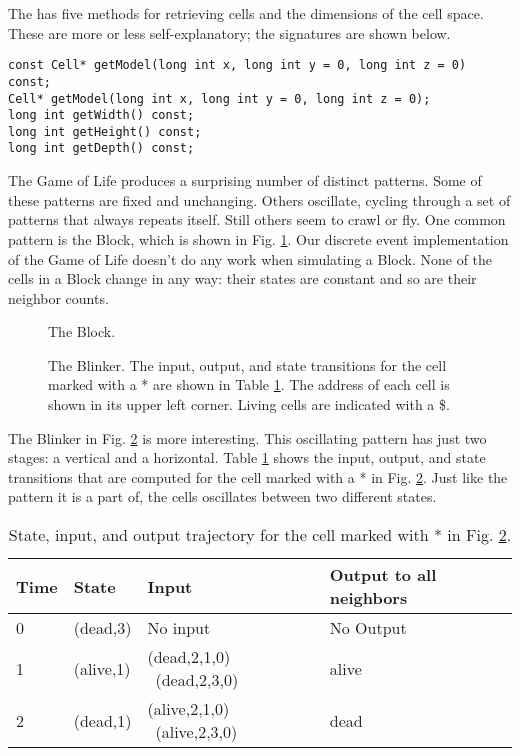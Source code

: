 The  has five methods for retrieving cells and the dimensions of the cell space. These are more or less self-explanatory; the signatures are shown below.
\begin{verbatim}
const Cell* getModel(long int x, long int y = 0, long int z = 0) const;
Cell* getModel(long int x, long int y = 0, long int z = 0);
long int getWidth() const;
long int getHeight() const;
long int getDepth() const;
\end{verbatim}

The Game of Life produces a surprising number of distinct patterns. Some of these patterns are fixed and unchanging. Others oscillate, cycling through a set of patterns that always repeats itself. Still others seem to crawl or fly. One common pattern is the Block, which is shown in Fig. \ref{fig:gol_block}. Our discrete event implementation of the Game of Life doesn't do any work when simulating a Block. None of the cells in a Block change in any way: their states are constant and so are their neighbor counts.
\begin{figure}[ht]
\centering
{}
\caption{The Block.}
\label{fig:gol_block}
\end{figure}

\begin{figure}[ht]
\centering
{}
\caption{The Blinker. The input, output, and state transitions for the cell marked with a * are shown in Table \ref{tab:blinker_cell_activity}. The address of each cell is shown in its upper left corner. Living cells are indicated with a \$.}
\label{fig:gol_blinker}
\end{figure}
The Blinker in Fig. \ref{fig:gol_blinker} is more interesting. This oscillating pattern has just two stages: a vertical and a horizontal. Table \ref{tab:blinker_cell_activity} shows the input, output, and state transitions that are computed for the cell marked with a * in Fig. \ref{fig:gol_blinker}. Just like the pattern it is a part of, the cells oscillates between two different states.
\begin{table}[ht]
\centering
\begin{tabular}{|l|l|l|l|}
\hline Time & State      & Input & Output to all neighbors\\ \hline
0 & (dead,3) & No input & No Output \\ \hline 
1 & (alive,1) & (dead,2,1,0) \ (dead,2,3,0) & alive \\ \hline 
2 & (dead,1) & (alive,2,1,0) \ (alive,2,3,0) & dead \\ \hline
\end{tabular}
\caption{State, input, and output trajectory for the cell marked with * in Fig. \ref{fig:gol_blinker}.}
\label{tab:blinker_cell_activity}
\end{table}

